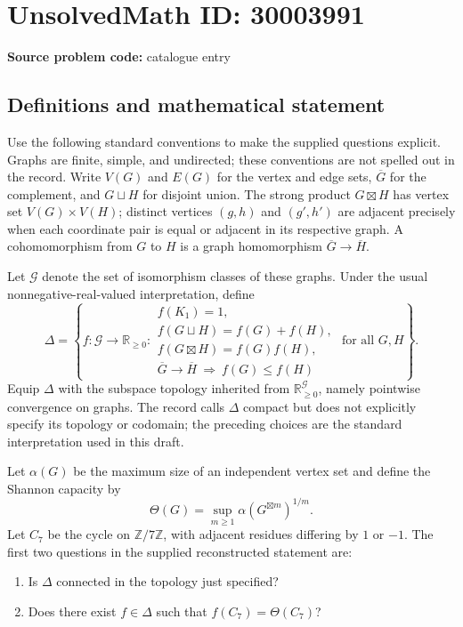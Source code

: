 \documentclass[11pt]{article}
\newcommand{\Z}{\mathbb{Z}}
\newcommand{\R}{\mathbb{R}}
\begin{document}
\section*{UnsolvedMath ID: 30003991}
\textbf{Source problem code:} catalogue entry
\subsection{Definitions and mathematical statement}
Use the following standard conventions to make the supplied questions explicit. Graphs are finite, simple, and undirected; these conventions are not spelled out in the record. Write \(V(G)\) and \(E(G)\) for the vertex and edge sets, \(\overline G\) for the complement, and \(G\sqcup H\) for disjoint union. The strong product \(G\boxtimes H\) has vertex set \(V(G)\times V(H)\); distinct vertices \((g,h)\) and \((g',h')\) are adjacent precisely when each coordinate pair is equal or adjacent in its respective graph. A cohomomorphism from \(G\) to \(H\) is a graph homomorphism \(\overline G\to\overline H\).

Let \(\mathcal G\) denote the set of isomorphism classes of these graphs. Under the usual nonnegative-real-valued interpretation, define
\[
\Delta=\left\{f:\mathcal G\to\R_{\geq0}:\begin{array}{l}
f(K_1)=1,\\
f(G\sqcup H)=f(G)+f(H),\\
f(G\boxtimes H)=f(G)f(H),\\
\overline G\to\overline H\ \Longrightarrow\ f(G)\leq f(H)
\end{array}\text{ for all }G,H\right\}.
\]
Equip \(\Delta\) with the subspace topology inherited from \(\R_{\geq0}^{\mathcal G}\), namely pointwise convergence on graphs. The record calls \(\Delta\) compact but does not explicitly specify its topology or codomain; the preceding choices are the standard interpretation used in this draft.

Let \(\alpha(G)\) be the maximum size of an independent vertex set and define the Shannon capacity by
\[
\Theta(G)=\sup_{m\geq1}\alpha(G^{\boxtimes m})^{1/m}.
\]
Let \(C_7\) be the cycle on \(\Z/7\Z\), with adjacent residues differing by \(1\) or \(-1\). The first two questions in the supplied reconstructed statement are:
\begin{enumerate}
\item Is \(\Delta\) connected in the topology just specified?
\item Does there exist \(f\in\Delta\) such that \(f(C_7)=\Theta(C_7)\)?
\end{enumerate}
\end{document}
